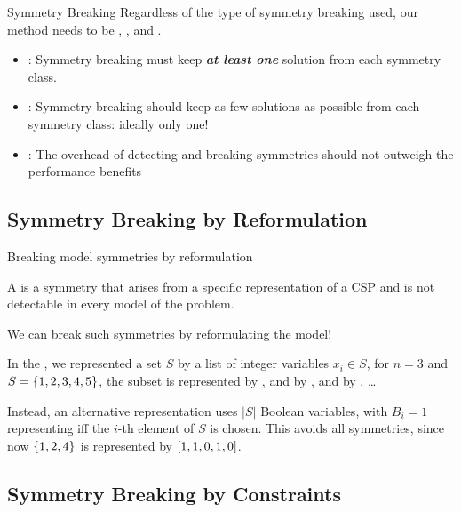 \documentclass{cons-beamer}
\newcommand{\subsetSumProblem}{\problemClass{SubsetSum}}
\begin{document}
\begin{frame}{Symmetry Breaking}
  Regardless of the type of symmetry breaking used, our method needs to be , , and .
  \vfill

  \begin{itemize}
    \item {}: Symmetry breaking must keep \textbf{\textit{at least one}} solution from each symmetry class.
    \item {}: Symmetry breaking should keep as few solutions as possible from each symmetry class: \alert{ideally only one!}
    \item {}: The overhead of detecting and breaking symmetries should not outweigh the performance benefits
  \end{itemize}
\end{frame}

\subsection{Symmetry Breaking by Reformulation}

\begin{frame}{Breaking model symmetries by reformulation}
  \begin{definition}[recap]
    A  is a symmetry that arises from a specific representation of a CSP and is not detectable in every model of the problem.
  \end{definition}
  \vfill

  We can break such symmetries by reformulating the model!
  \vfill

  \begin{example}
    In the \subsetSumProblem, we represented a set $S$ by a list of integer variables $x_i \in S$, \eg for $n=3$ and $S = \{1,2,3,4,5\}$, the subset  is represented by , and by , and by , \ldots

    \parBreak
    Instead, an alternative representation uses $|S|$ Boolean variables, with $B_i = 1$ representing iff the $i$-th element of $S$ is chosen.
    This avoids all symmetries, since now $\{1,2,4\}$ is  represented by $[1,1,0,1,0]$.
  \end{example}
\end{frame}

\subsection{Symmetry Breaking by Constraints}
\end{document}

